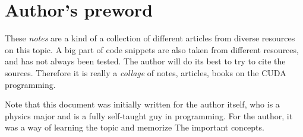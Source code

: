 \documentclass[12pt]{article}
\begin{document}


\newpage
\section*{Author's preword}
These \textit{notes} are a kind of a collection of different articles from diverse resources on this topic. A big part of code snippets 
are also taken from different resources, and has not always been tested. The author will do its best to try to cite the sources. 
Therefore it is really a \textit{collage} of notes, articles, books on the CUDA programming.

Note that this document was initially written for the author itself, who is a physics major 
and is a fully self-taught guy in programming. 
For the author, it was a way of learning the topic and memorize 
The important concepts. 
\end{document}
